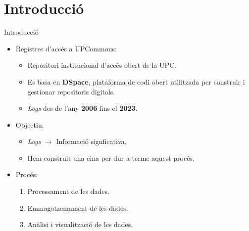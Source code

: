 \section{Introducció}\label{sec:introduction}

\begin{frame}{Introducció}
    \begin{itemize}[<+- | alert@+>]
        \item Registres d'accés a UPCommons:
        \begin{itemize}[<+- | alert@+>]
            \item Repositori institucional d’accés obert de la UPC.
            \item Es basa en \textbf{DSpace}, plataforma de codi obert utilitzada per construir i gestionar repositoris digitals.
            \item \textit{Logs} des de l'any \textbf{2006} fins el \textbf{2023}.
        \end{itemize}
        \item Objectiu:
        \begin{itemize}
            \item \textit{Logs} \(\rightarrow\) Informació signficativa.
            \item Hem construit una eina per dur a terme aquest procés.
        \end{itemize}
        \item Procés:
        \begin{enumerate}
            \item Processament de les dades.
            \item Emmagatzemament de les dades.
            \item Anàlisi i visualització de les dades.
        \end{enumerate}
    \end{itemize}
\end{frame}
